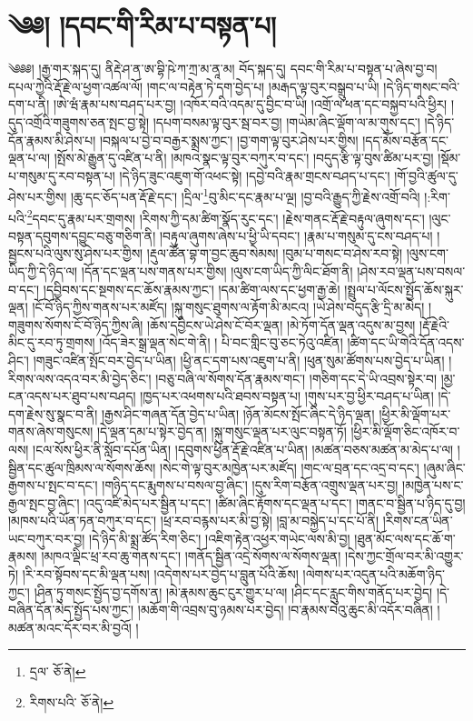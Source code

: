 \setcounter{footnote}{0} 
\chapter{༄༅། །དབང་གི་རིམ་པ་བསྟན་པ།}༄༅༅། །རྒྱ་གར་སྐད་དུ། ནིརྡེ་ཤ་ན་ཨ་བྷི་ཥེ་ཀ་ཀྲ་མ་ནཱ་མ། བོད་སྐད་དུ། དབང་གི་རིམ་པ་བསྟན་པ་ཞེས་བྱ་བ། དཔལ་ཀྱེའི་རྡོ་རྗེ་ལ་ཕྱག་འཚལ་ལོ། །གང་ལ་བརྟེན་ཏེ་དག་བྱེད་པ། །མརྒད་ལྟ་བུར་བསྒྲུབ་པ་ཡི། །དེ་ཉིད་གསང་བའི་དག་པ་ནི། །ཨེ་ཝཾ་རྣམ་པས་བཤད་པར་བྱ། །འཁོར་བའི་འདམ་དུ་བྱིང་བ་ཡི། །འགྲོ་ལ་ཕན་དང་བསྐྱབ་པའི་ཕྱིར། །དུད་འགྲོའི་གཟུགས་ཅན་སྤང་བྱ་སྟེ། །དཔག་བསམ་ལྟ་བུར་སྦ་བར་བྱ། །གཡེམ་ཞིང་ལྡོག་ལ་མ་གུས་དང་། །དེ་ཉིད་དོན་རྣམས་མི་ཤེས་པ། །བསྐལ་པ་བྱེ་བ་བརྒྱར་སྨྲས་ཀྱང་། །བྱ་གག་ལྟ་བུར་ཤེས་པར་གྱིས། །དད་མོས་བརྩོན་དང་ལྡན་པ་ལ། །སྤོས་མེ་རྒྱུན་དུ་འཛིན་པ་ནི། །མཁའ་སྣང་ལྟ་བུར་བཀུར་བ་དང་། །བདུད་རྩི་ལྟ་བུས་ཚིམ་པར་བྱ། །སྡོམ་པ་གསུམ་དུ་རབ་བསྟན་པ། །དེ་ཉིད་ཟུང་འཇུག་གོ་འཕང་སྟེ། །དབྱེ་བའི་རྣམ་གྲངས་བཤད་པ་དང་། །གོ་བྱའི་ཚུལ་དུ་ཤེས་པར་གྱིས། །ཆུ་དང་ཅོད་པན་རྡོ་རྗེ་དང་། །དྲིལ་\footnote{དྲལ་  ཅོ་ནེ། }བུ་མིང་དང་རྣམ་པ་ལྔ། །བྱ་བའི་རྒྱུད་ཀྱི་རྗེས་འགྲོ་བའི། །:རིག་པའི་\footnote{རིགས་པའི་  ཅོ་ནེ། }དབང་དུ་རྣམ་པར་གྲགས། །རིགས་ཀྱི་དམ་ཚིག་སྣོད་རུང་དང་། །རྗེས་གནང་རྡོ་རྗེ་བརྟུལ་ཞུགས་དང་། །ལུང་བསྟན་དབུགས་དབྱུང་བཅུ་གཅིག་ནི། །བརྟུལ་ཞུགས་ཞེས་པ་ཕྱི་ཡི་དབང་། །རྣམ་པ་གསུམ་དུ་ངས་བཤད་པ། །སྦྱངས་པའི་ལུས་སུ་ཤེས་པར་གྱིས། །རྡུལ་ཚོན་བྷ་ག་བྱང་ཆུབ་སེམས། །བུམ་པ་གསང་བ་ཤེས་རབ་སྟེ། །ལུས་ངག་ཡིད་ཀྱི་དེ་ཉིད་ལ། །དོན་དང་ལྡན་པས་གནས་པར་གྱིས། །ལུས་ངག་ཡིད་ཀྱི་ལིང་ཐོག་ནི། །ཤེས་རབ་ལྡན་པས་བསལ་བ་དང་། །དབྱིབས་དང་སྔགས་དང་ཆོས་རྣམས་ཀྱང་། །དམ་ཚིག་ལས་དང་ཕྱག་རྒྱ་ཆེ། །སྤྲུལ་པ་ལོངས་སྤྱོད་ཆོས་སྐུར་ལྡན། །ངོ་བོ་ཉིད་ཀྱིས་གནས་པར་མཛོད། །སྐུ་གསུང་ཐུགས་ལ་རྟོག་མི་མངའ། །ཡེ་ཤེས་བདུད་རྩི་དྲི་མ་མེད། །གཟུགས་སོགས་ངོ་བོ་ཉིད་ཀྱིས་ཞི། །ཆོས་དབྱིངས་ཡེ་ཤེས་ངོ་བོར་ལྡན། །མེ་ཏོག་དོན་ལྡན་འདུས་མ་བྱས། །རྡོ་རྗེའི་མིང་དུ་རབ་ཏུ་གྲགས། །འོད་ཟེར་སྒྲ་ལྡན་སེང་གེ་ནི། །
པི་བང་གླིང་བུ་ཅང་ཏེའུ་འཛིན། །ཚིག་དང་ཡི་གེའི་དོན་འདས་ཤིང་། །གཟུང་འཛིན་སྤོང་བར་བྱེད་པ་ཡིན། །ཕྱི་ནང་དག་པས་འཇུག་པ་ནི། །ཕུན་སུམ་ཚོགས་པས་བྱེད་པ་ཡིན། །རིགས་ལས་འདའ་བར་མི་བྱེད་ཅིང་། །བཅུ་བཞི་ལ་སོགས་དོན་རྣམས་གང་། །གཅིག་དང་དེ་ཡི་འབྲས་སྟེར་བ། །མྱ་ངན་འདས་པར་ཐུབ་པས་བཤད། །ཁྱད་པར་འཕགས་པའི་ཐབས་བསྟན་པ། །གུས་པར་བྱ་ཕྱིར་བཤད་པ་ཡིན། །དེ་དག་རྗེས་སུ་སྣང་བ་ནི། །རྒྱས་ཤིང་གཞན་དོན་བྱེད་པ་ཡིན། །ཉོན་མོངས་སྤོང་ཞིང་དེ་ཉིད་ལྡན། །ཕྱིར་མི་ལྡོག་པར་གནས་ཞེས་གསུངས། །དེ་ལྡན་དམ་པ་སྟེར་བྱེད་ན། །སྐུ་གསུང་ལྡན་པར་ལུང་བསྟན་ཏོ། །ཕྱིར་མི་ལྡོག་ཅིང་འཁོར་བ་ལས། །ངལ་སོས་ཕྱིར་ནི་སློབ་དཔོན་ཡིན། །དབུགས་ཕྱིན་རྡོ་རྗེ་འཛིན་པ་ཡིན། །མཚན་བཅས་མཚན་མ་མེད་པ་ལ། །སྦྱིན་དང་ཚུལ་ཁྲིམས་ལ་སོགས་ཆོས། །སེང་གེ་ལྟ་བུར་མཁྱེན་པར་མཛོད། །གང་ལ་བྲན་དང་འདྲ་བ་དང་། །ཞུམ་ཞིང་རྒྱགས་པ་སྤང་བ་དང་། །གཉིད་དང་རྨུགས་པ་བསལ་བྱ་ཞིང་། །དུས་རིག་བརྩོན་འགྲུས་ལྡན་པར་བྱ། །མཁྱེན་པས་ང་རྒྱལ་སྤང་བྱ་ཞིང་། །འདུ་འཛི་མེད་པར་སྦྱིན་པ་དང་། །ཚིམ་ཞིང་རྟོགས་དང་ལྡན་པ་དང་། །གནང་བ་སྦྱིན་པ་ཉིད་དུ་བྱ། །མཁས་པའི་ཡོན་ཏན་བཀུར་བ་དང་། །ཕྲ་རབ་བརྙས་པར་མི་བྱ་སྟེ། །བླ་མ་བསྐྱེད་པ་དང་པོ་ནི། །རིགས་ངན་ཡིན་ཡང་བཀུར་བར་བྱ། །དེ་ཉིད་མི་སྨྲ་ཚོད་རིག་ཅིང་། །འཇིག་རྟེན་འཕྱར་གཡེང་ལས་མི་བྱ། །ཐུན་མོང་ལས་དང་ཆོ་ག་རྣམས། །མཁའ་ལྡིང་ཕྲ་རབ་ཆུ་གནས་དང་། །གནོད་སྦྱིན་འདྲེ་སོགས་ལ་སོགས་ལྡན། །དེས་ཀྱང་གྲོལ་བར་མི་འགྱུར་ཏེ། །རི་རབ་སྟོབས་དང་མི་ལྡན་པས། །འདེགས་པར་བྱེད་པ་བླུན་པོའི་ཆོས། །ལེགས་པར་འདུན་པའི་མཆོག་ཉིད་ཀྱང་། །ཤིན་ཏུ་གསང་སྤྱོད་བྱ་དགོས་ན། །མེ་རྣམས་ཆུང་ངུར་གྱུར་པ་ལ། །ཤིང་དང་རླུང་གིས་གནོད་པར་བྱེད། །དེ་བཞིན་དོན་མེད་སྤྱོད་པས་ཀྱང་། །མཆོག་གི་འབྲས་བུ་ཉམས་པར་བྱེད། །བ་རྣམས་བེའུ་ཆུང་མི་འདོར་བཞིན། །མཚན་མའང་དོར་བར་མི་བྱའོ། །
